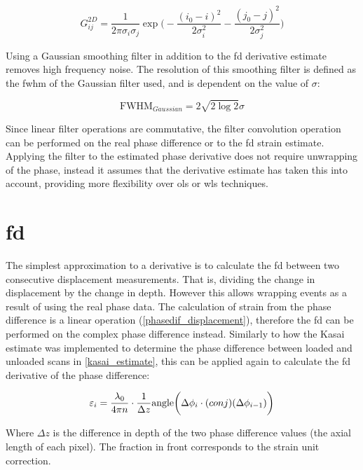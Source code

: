 \begin{equation}
	\label{gauss_2d}
	G^{2D}_{ij} = \frac{1}{2\pi \sigma_i \sigma_j } \exp{ 
	\bigg( - \frac{(i_0 - i)^2}{2 \sigma_i^2} - \frac{(j_0 - j)^2}{2 \sigma_j^2} \bigg)}
\end{equation}

Using a Gaussian smoothing filter in addition to the \ac{fd} derivative estimate removes high frequency noise. The resolution of this smoothing filter is defined as the \ac{fwhm} of the Gaussian filter used, and is dependent on the value of $\sigma$:

\begin{equation}
	\label{gauss_fwhm}
	\text{FWHM}_{Gaussian} = 2 \sqrt{2 \log{2}} \sigma
\end{equation}

Since linear filter operations are commutative, the filter convolution operation can be performed on the real phase difference or to the \ac{fd} strain estimate. Applying the filter to the estimated phase derivative does not require unwrapping of the phase, instead it assumes that the derivative estimate has taken this into account, providing more flexibility over \ac{ols} or \ac{wls} techniques.

\section{\ac{fd}}\label{fd}

The simplest approximation to a derivative is to calculate the \ac{fd} between two consecutive displacement measurements. That is, dividing the change in displacement by the change in depth. However this allows wrapping events as a result of using the real phase data. The calculation of strain from the phase difference is a linear operation (\autoref{phasedif_displacement}), therefore the \ac{fd} can be performed on the complex phase difference instead. Similarly to how the Kasai estimate was implemented to determine the phase difference between loaded and unloaded scans in \autoref{kasai_estimate}, this can be applied again to calculate the \ac{fd} derivative of the phase difference:

\begin{equation}
	\varepsilon_i = \frac{\lambda_0}{4\pi n} \cdot \frac{1}{\Delta z} \text{angle}\bigg( \Delta \phi_i \cdot \text(conj)(\Delta \phi_{i-1}) \bigg)
	\label{fd_strain}
\end{equation}

Where $\Delta z$ is the difference in depth of the two phase difference values (the axial length of each pixel). The fraction in front corresponds to the strain unit correction.

